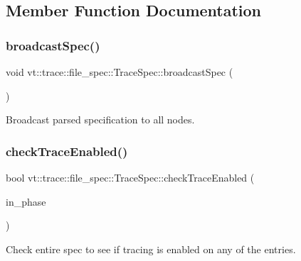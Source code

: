\subsection{Member Function Documentation}
\mbox{\label{structvt_1_1trace_1_1file__spec_1_1_trace_spec_a3a5ececf49f827a057a7bea8ac7e7584}} 
\subsubsection{\texorpdfstring{broadcast\+Spec()}{broadcastSpec()}}
{\footnotesize\ttfamily void vt\+::trace\+::file\+\_\+spec\+::\+Trace\+Spec\+::broadcast\+Spec (\begin{DoxyParamCaption}{ }\end{DoxyParamCaption})}



Broadcast parsed specification to all nodes. 

\mbox{\label{structvt_1_1trace_1_1file__spec_1_1_trace_spec_adf331a01f94b57cb9229c89311f1bcda}} 
\subsubsection{\texorpdfstring{check\+Trace\+Enabled()}{checkTraceEnabled()}}
{\footnotesize\ttfamily bool vt\+::trace\+::file\+\_\+spec\+::\+Trace\+Spec\+::check\+Trace\+Enabled (\begin{DoxyParamCaption}\item[{\hyperlink{structvt_1_1trace_1_1file__spec_1_1_trace_spec_a4dd2e8fb971930351812d0f286baece2}{Spec\+Index}}]{in\+\_\+phase }\end{DoxyParamCaption})}



Check entire spec to see if tracing is enabled on any of the entries. 


